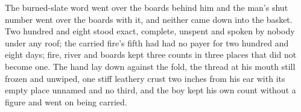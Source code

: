 The burned-slate word went over the boards behind him and the man's shut number went over the boards with it, and neither came down into the basket. Two hundred and eight stood exact, complete, unspent and spoken by nobody under any roof; the carried fire's fifth had had no payer for two hundred and eight days; fire, river and boards kept three counts in three places that did not become one. The hand lay down against the fold, the thread at his mouth still frozen and unwiped, one stiff leathery crust two inches from his ear with its empty place unnamed and no third, and the boy kept his own count without a figure and went on being carried.

